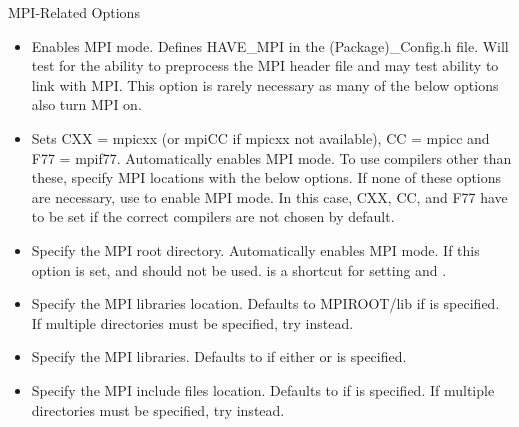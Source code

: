 MPI-Related Options

\begin{itemize}
\item {}

Enables MPI mode. Defines HAVE\_MPI in the (Package)\_Config.h file. Will test
for the ability to preprocess the MPI header file and may test ability to link
with MPI.  This option is rarely necessary as many of the below options also
turn MPI on.

\item {}

Sets CXX = mpicxx (or mpiCC if mpicxx not available), CC = mpicc and
F77 = mpif77.  Automatically enables MPI mode.  To use compilers other than
these, specify MPI locations with the below options.  If none of these options
are necessary, use  to enable MPI mode.  In this
case, CXX, CC, and F77 have to be set if the correct compilers are
not chosen by default.

\item {}

Specify the MPI root directory. Automatically enables MPI mode.  If this
option is set,  and
 should not be used.
 is a shortcut for setting \newline
{}
and \newline {}.

\item {}

Specify the MPI libraries location. Defaults to MPIROOT/lib if
 is specified. If multiple directories must be
specified, try \newline
{} instead.

\item {}

Specify the MPI libraries. Defaults to 
 if either or
 is specified.

\item {}

Specify the MPI include files location. Defaults to  if
 is specified. If multiple directories  must be specified, try
\newline
{} instead.
\end{itemize}

